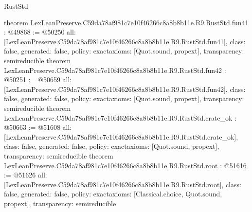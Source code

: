 \begin{lexlean}{RustStd}
\begin{coremodule}
{}
theorem LexLeanPreserve.C59da78af981c7e10f46266c8a8b8b11e.R9.RustStd.fun41 : @49868 := @50250 {
  all: [LexLeanPreserve.C59da78af981c7e10f46266c8a8b8b11e.R9.RustStd.fun41],
  class: false,
  generated: false,
  policy: exact{axioms: [Quot.sound, propext]},
  transparency: semireducible
}
theorem LexLeanPreserve.C59da78af981c7e10f46266c8a8b8b11e.R9.RustStd.fun42 : @50251 := @50659 {
  all: [LexLeanPreserve.C59da78af981c7e10f46266c8a8b8b11e.R9.RustStd.fun42],
  class: false,
  generated: false,
  policy: exact{axioms: [Quot.sound, propext]},
  transparency: semireducible
}
theorem LexLeanPreserve.C59da78af981c7e10f46266c8a8b8b11e.R9.RustStd.crate_ok : @50663 := @51608 {
  all: [LexLeanPreserve.C59da78af981c7e10f46266c8a8b8b11e.R9.RustStd.crate_ok],
  class: false,
  generated: false,
  policy: exact{axioms: [Quot.sound, propext]},
  transparency: semireducible
}
theorem LexLeanPreserve.C59da78af981c7e10f46266c8a8b8b11e.R9.RustStd.root : @51616 := @51626 {
  all: [LexLeanPreserve.C59da78af981c7e10f46266c8a8b8b11e.R9.RustStd.root],
  class: false,
  generated: false,
  policy: exact{axioms: [Classical.choice, Quot.sound, propext]},
  transparency: semireducible
}


\end{coremodule}
\end{lexlean}
